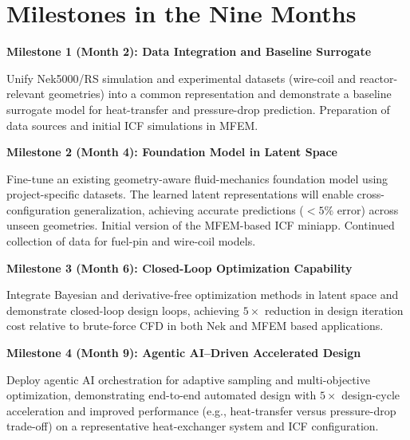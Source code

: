 \section{Milestones in the Nine Months}

%      

\noindent
\textbf{Milestone 1 (Month 2): Data Integration and Baseline Surrogate}

Unify Nek5000/RS simulation and experimental datasets
(wire-coil and reactor-relevant geometries) into a common representation
and demonstrate a baseline surrogate model for heat-transfer and
pressure-drop prediction. 
Preparation of data sources and initial ICF simulations in MFEM.

\vspace{4pt}

\noindent
\textbf{Milestone 2 (Month 4): Foundation Model in Latent Space}

Fine-tune an existing geometry-aware fluid-mechanics foundation model
using project-specific datasets. The learned latent representations will
enable cross-configuration generalization, achieving accurate predictions
($<5\%$ error) across unseen geometries. 
Initial version of the MFEM-based ICF miniapp.
Continued collection of data for fuel-pin and wire-coil models.

\vspace{4pt}

\noindent
\textbf{Milestone 3 (Month 6): Closed-Loop Optimization Capability}

Integrate Bayesian and derivative-free optimization methods in latent
space and demonstrate closed-loop design loops, achieving 
$5\times$ reduction in design iteration cost relative to
brute-force CFD in both Nek and MFEM based applications.

\vspace{4pt}

\noindent
\textbf{Milestone 4 (Month 9): Agentic AI--Driven Accelerated Design}

Deploy agentic AI orchestration for adaptive sampling and multi-objective
optimization, demonstrating end-to-end automated design with $5\times$
design-cycle acceleration and improved performance (e.g., heat-transfer versus
pressure-drop trade-off) on a representative heat-exchanger system and ICF
configuration.

